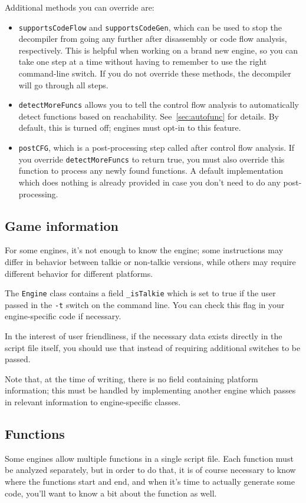 Additional methods you can override are:
\begin{itemize}
\item \verb+supportsCodeFlow+ and \verb+supportsCodeGen+, which can be used to stop the decompiler from going any further after disassembly or code flow analysis, respectively. This is helpful when working on a brand new engine, so you can take one step at a time without having to remember to use the right command-line switch. If you do not override these methods, the decompiler will go through all steps.
\item \verb+detectMoreFuncs+ allows you to tell the control flow analysis to automatically detect functions based on reachability. See~\vref{sec:autofunc} for details. By default, this is turned off; engines must opt-in to this feature.
\item \verb+postCFG+, which is a post-processing step called after control flow analysis. If you override \verb+detectMoreFuncs+ to return true, you must also override this function to process any newly found functions. A default implementation which does nothing is already provided in case you don't need to do any post-processing.
\end{itemize}

\subsection{Game information}
For some engines, it's not enough to know the engine; some instructions may differ in behavior between talkie or non-talkie versions, while others may require different behavior for different platforms.

The \verb+Engine+ class contains a field \verb+_isTalkie+ which is set to true if the user passed in the \verb+-t+ switch on the command line. You can check this flag in your engine-specific code if necessary.

In the interest of user friendliness, if the necessary data exists directly in the script file itself, you should use that instead of requiring additional switches to be passed.

Note that, at the time of writing, there is no field containing platform information; this must be handled by implementing another engine which passes in relevant information to engine-specific classes.

\subsection{Functions}
Some engines allow multiple functions in a single script file. Each function must be analyzed separately, but in order to do that, it is of course necessary to know where the functions start and end, and when it's time to actually generate some code, you'll want to know a bit about the function as well.

